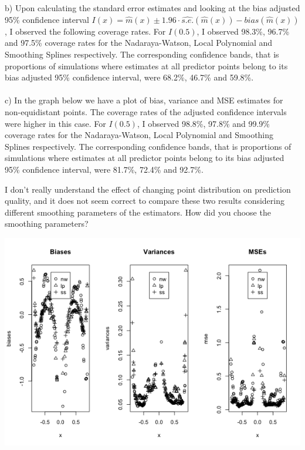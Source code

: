 \documentclass[a4paper,12pt]{article}
\begin{document}
b) Upon calculating the standard error estimates and looking at the bias adjusted 95\% confidence interval $I(x) = \hat{m}(x) \pm 1.96 \cdot \widehat{s.e.}(\hat{m}(x)) - \widehat{bias}(\hat{m}(x))$, I observed the following coverage rates. For $I(0.5)$, I observed 98.3\%, 96.7\% and 97.5\% coverage rates for the Nadaraya-Watson, Local Polynomial and Smoothing Splines respectively.  The corresponding confidence bands, that is proportions of simulations where estimates at all predictor points belong to its bias adjusted 95\% confidence interval, were 68.2\%, 46.7\% and 59.8\%.
\\
\\
c) In the graph below we have a plot of bias, variance and MSE estimates for non-equidistant points. The coverage rates of the adjusted confidence intervals were higher in this case. For $I(0.5)$, I observed 98.8\%, 97.8\% and 99.9\% coverage rates for the Nadaraya-Watson, Local Polynomial and Smoothing Splines respectively.  The corresponding confidence bands, that is proportions of simulations where estimates at all predictor points belong to its bias adjusted 95\% confidence interval, were 81.7\%, 72.4\% and 92.7\%.

I don't really understand the effect of changing point distribution on prediction quality, and it does not seem correct to compare these two results considering different smoothing parameters of the estimators. How did you choose the smoothing parameters?

\includegraphics[scale = 0.75]{hmw3_plot3.png}
\end{document}
